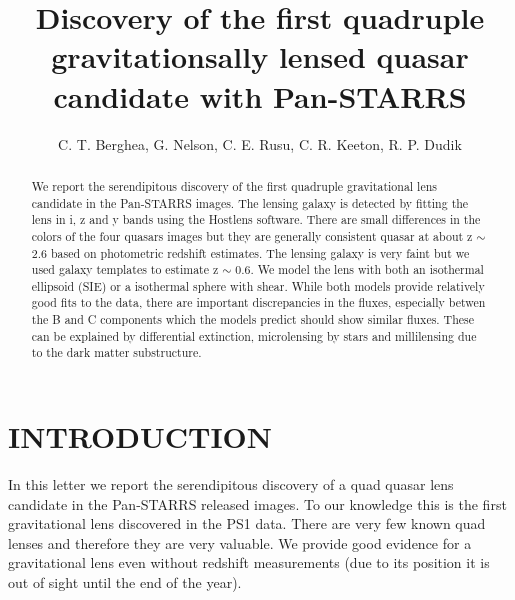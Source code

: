 \documentclass[manuscript]{aastex}
\begin{document}
\title{ Discovery of the first quadruple gravitationsally lensed quasar candidate with Pan-STARRS }

\author{C. T. Berghea, G. Nelson, C. E. Rusu, C. R. Keeton, R. P. Dudik}




\begin{abstract}

We report the serendipitous discovery of the first quadruple gravitational lens candidate in the Pan-STARRS images. The lensing galaxy is detected by fitting the lens in i, z and y bands using the Hostlens software. There are small differences in the colors of the four quasars images but they are generally consistent quasar at about z $\sim$ 2.6 based on photometric redshift estimates. The lensing galaxy is very faint but we used galaxy templates to estimate z $\sim$ 0.6. We model the lens with both an isothermal ellipsoid (SIE) or a isothermal sphere with shear. While both models provide relatively good fits to the data, there are important discrepancies in the fluxes, especially betwen the B and C components which the models predict should show similar fluxes. These can be explained by differential extinction, microlensing by stars and millilensing due to the dark matter substructure. 
\end{abstract}


\section{INTRODUCTION}

In this letter we report the serendipitous discovery of a quad quasar lens candidate in the Pan-STARRS released images. To our knowledge this is the first gravitational lens discovered in the PS1 data. There are very few known quad lenses and therefore they are very valuable. We provide good evidence for a gravitational lens even without redshift measurements (due to its position it is out of sight until the end of the year).
\end{document}
